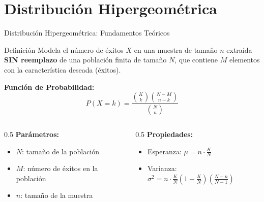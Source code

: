 \documentclass[aspectratio=169, 10pt]{beamer}
\begin{document}
\section{Distribución Hipergeométrica}

\begin{frame}{Distribución Hipergeométrica: Fundamentos Teóricos}
    \begin{block}{Definición}
        Modela el número de éxitos $X$ en una muestra de tamaño $n$ extraída \textbf{SIN reemplazo} de una población finita de tamaño $N$, que contiene $M$ elementos con la característica deseada (éxitos).
    \end{block}
    
    \vspace{0.2cm}
    \textbf{Función de Probabilidad:}
    $$P(X = k) = \frac{\binom{K}{k} \binom{N-M}{n-k}}{\binom{N}{n}}$$

    \begin{columns}
        \begin{column}{0.5\textwidth}
            \textbf{Parámetros:}
            \begin{itemize}
                \item $N$: tamaño de la población
                \item $M$: número de éxitos en la población
                \item $n$: tamaño de la muestra
            \end{itemize}
        \end{column}
        \begin{column}{0.5\textwidth}
            \textbf{Propiedades:}
            \begin{itemize}
                \item Esperanza: $\mu = n \cdot \frac{K}{N}$
                \item Varianza: $\sigma^2 = n \cdot \frac{K}{N} \left(1 - \frac{K}{N}\right) \left(\frac{N-n}{N-1}\right)$
            \end{itemize}
        \end{column}
    \end{columns}
\end{frame}
\end{document}
